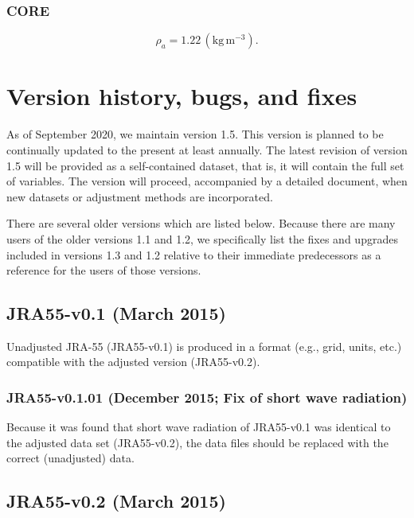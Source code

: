 \documentclass[dvipdfmx]{elsarticle_mod}
\begin{document}
\subsubsection{CORE}

\begin{equation}
\rho_{a} = 1.22 \,(\mathrm{kg}\, \mathrm{m}^{-3}).
\end{equation}


\section{Version history, bugs, and fixes}

\label{app:version}

As of September 2020, we maintain version 1.5. This version is planned to be continually updated to the present at least annually. The latest revision of version 1.5 will be provided as a self-contained dataset, that is, it will contain the full set of variables. The version will proceed, accompanied by a detailed document, when new datasets or adjustment methods are incorporated. 

There are several older versions which are listed below. Because there are many users of the older versions 1.1 and 1.2, we specifically list the fixes and upgrades included in versions 1.3 and 1.2 relative to their immediate predecessors as a reference for the users of those versions.

\subsection{JRA55-v0.1 (March 2015)}

Unadjusted JRA-55 (JRA55-v0.1) is produced in a format (e.g., grid, units, etc.) compatible with the adjusted version (JRA55-v0.2).

\subsubsection{JRA55-v0.1.01 (December 2015; Fix of short wave radiation)}

Because it was found that short wave radiation of JRA55-v0.1 was identical to the adjusted data set (JRA55-v0.2), the data files should be replaced with the correct (unadjusted) data.

\subsection{JRA55-v0.2 (March 2015)}
\end{document}

